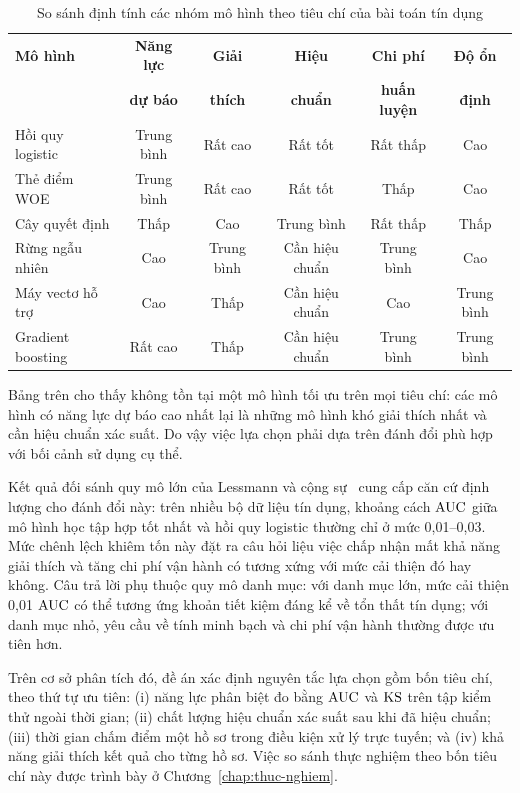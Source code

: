 \begin{table}[htbp]
\centering
\caption{So sánh định tính các nhóm mô hình theo tiêu chí của bài toán tín dụng}
\label{tab:so-sanh-mo-hinh}
\small
\begin{tabular}{@{}L{2.6cm}ccccc@{}}
\toprule
\textbf{Mô hình} & \textbf{Năng lực} & \textbf{Giải} & \textbf{Hiệu} &
\textbf{Chi phí} & \textbf{Độ ổn} \\
 & \textbf{dự báo} & \textbf{thích} & \textbf{chuẩn} & \textbf{huấn luyện} &
 \textbf{định} \\
\midrule
Hồi quy logistic      & Trung bình & Rất cao    & Rất tốt    & Rất thấp  & Cao \\
Thẻ điểm WOE          & Trung bình & Rất cao    & Rất tốt    & Thấp      & Cao \\
Cây quyết định        & Thấp       & Cao        & Trung bình & Rất thấp  & Thấp \\
Rừng ngẫu nhiên       & Cao        & Trung bình & Cần hiệu chuẩn & Trung bình & Cao \\
Máy vectơ hỗ trợ      & Cao        & Thấp       & Cần hiệu chuẩn & Cao       & Trung bình \\
Gradient boosting     & Rất cao    & Thấp       & Cần hiệu chuẩn & Trung bình & Trung bình \\
\bottomrule
\end{tabular}
\end{table}

Bảng trên cho thấy không tồn tại một mô hình tối ưu trên mọi tiêu chí: các mô
hình có năng lực dự báo cao nhất lại là những mô hình khó giải thích nhất và cần
hiệu chuẩn xác suất. Do vậy việc lựa chọn phải dựa trên đánh đổi phù hợp với bối
cảnh sử dụng cụ thể.

Kết quả đối sánh quy mô lớn của Lessmann và cộng sự~\cite{lessmann2015} cung cấp
căn cứ định lượng cho đánh đổi này: trên nhiều bộ dữ liệu tín dụng, khoảng cách
$\mathrm{AUC}$ giữa mô hình học tập hợp tốt nhất và hồi quy logistic thường chỉ ở mức
0,01--0,03. Mức chênh lệch khiêm tốn này đặt ra câu hỏi liệu việc chấp nhận mất
khả năng giải thích và tăng chi phí vận hành có tương xứng với mức cải thiện đó
hay không. Câu trả lời phụ thuộc quy mô danh mục: với danh mục lớn, mức cải thiện
0,01 $\mathrm{AUC}$ có thể tương ứng khoản tiết kiệm đáng kể về tổn thất tín dụng; với
danh mục nhỏ, yêu cầu về tính minh bạch và chi phí vận hành thường được ưu tiên
hơn.

Trên cơ sở phân tích đó, đề án xác định nguyên tắc lựa chọn gồm bốn tiêu chí,
theo thứ tự ưu tiên: (i) năng lực phân biệt đo bằng $\mathrm{AUC}$ và $\mathrm{KS}$ trên tập kiểm
thử ngoài thời gian; (ii) chất lượng hiệu chuẩn xác suất sau khi đã hiệu chuẩn;
(iii) thời gian chấm điểm một hồ sơ trong điều kiện xử lý trực tuyến; và (iv)
khả năng giải thích kết quả cho từng hồ sơ. Việc so sánh thực nghiệm theo bốn
tiêu chí này được trình bày ở Chương~\ref{chap:thuc-nghiem}.

